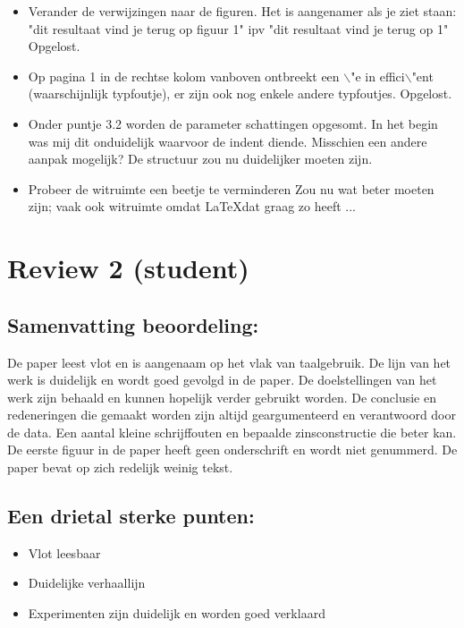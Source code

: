 \documentclass[11pt]{article}
\begin{document}
\begin{itemize}
\item Verander de verwijzingen naar de figuren. Het is aangenamer als je ziet staan: "dit resultaat vind je terug op figuur 1" ipv "dit resultaat vind je terug op 1" {\color{red} Opgelost.}
\item Op pagina 1 in de rechtse kolom vanboven ontbreekt een $\backslash$"e in effici$\backslash$"ent (waarschijnlijk typfoutje), er zijn ook nog enkele andere typfoutjes. {\color{red} Opgelost.}

\item Onder puntje 3.2 worden de parameter schattingen opgesomt. In het begin was mij dit onduidelijk waarvoor de indent diende. Misschien een andere aanpak mogelijk? {\color{red} De structuur zou nu duidelijker moeten zijn.}
\item Probeer de witruimte een beetje te verminderen {\color{red} Zou nu wat beter moeten zijn; vaak ook witruimte omdat \LaTeX dat graag zo heeft ...}
\end{itemize}

\section{Review 2 (student)}
\subsection{Samenvatting beoordeling:}
De paper leest vlot en is aangenaam op het vlak van taalgebruik. De lijn van het werk is duidelijk en wordt goed gevolgd in de paper. De doelstellingen van het werk zijn behaald en kunnen hopelijk verder gebruikt worden. De conclusie en redeneringen die gemaakt worden zijn altijd geargumenteerd en verantwoord door de data. Een aantal kleine schrijffouten en bepaalde zinsconstructie die beter kan. De eerste figuur in de paper heeft geen onderschrift en wordt niet genummerd. De paper bevat op zich redelijk weinig tekst.

\subsection{Een drietal sterke punten:}
\begin{itemize}
\item Vlot leesbaar
\item Duidelijke verhaallijn
\item Experimenten zijn duidelijk en worden goed verklaard
\end{itemize}
\end{document}

